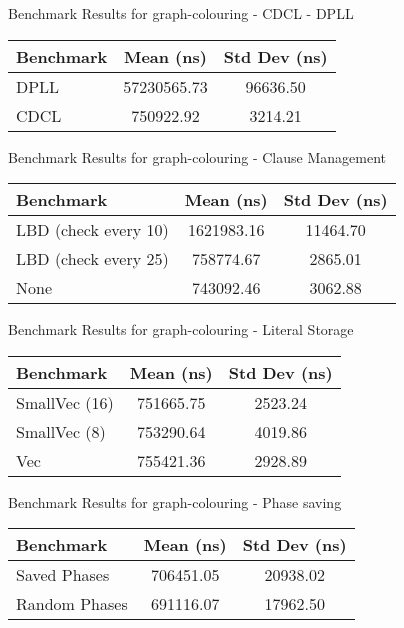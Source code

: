 \begin{cmptable}[h]{Benchmark Results for graph-colouring - CDCL - DPLL\label{tab:bench-graph-colouring---CDCL---DPLL}}
    \begin{tabular}{|l|c|c|}
        \hline
        Benchmark & Mean (ns) & Std Dev (ns) \\
        \hline
        DPLL & 57230565.73 & 96636.50 \\
        CDCL & 750922.92 & 3214.21 \\
        \hline
    \end{tabular}
\end{cmptable}


\begin{cmptable}[h]{Benchmark Results for graph-colouring - Clause Management\label{tab:bench-graph-colouring---Clause-Management}}
    \begin{tabular}{|l|c|c|}
        \hline
        Benchmark & Mean (ns) & Std Dev (ns) \\
        \hline
        LBD (check every 10) & 1621983.16 & 11464.70 \\
        LBD (check every 25) & 758774.67 & 2865.01 \\
        None & 743092.46 & 3062.88 \\
        \hline
    \end{tabular}
\end{cmptable}


\begin{cmptable}[h]{Benchmark Results for graph-colouring - Literal Storage\label{tab:bench-graph-colouring---Literal-Storage}}
    \begin{tabular}{|l|c|c|}
        \hline
        Benchmark & Mean (ns) & Std Dev (ns) \\
        \hline
        SmallVec (16) & 751665.75 & 2523.24 \\
        SmallVec (8) & 753290.64 & 4019.86 \\
        Vec & 755421.36 & 2928.89 \\
        \hline
    \end{tabular}
\end{cmptable}


\begin{cmptable}[h]{Benchmark Results for graph-colouring - Phase saving\label{tab:bench-graph-colouring---Phase-saving}}
    \begin{tabular}{|l|c|c|}
        \hline
        Benchmark & Mean (ns) & Std Dev (ns) \\
        \hline
        Saved Phases & 706451.05 & 20938.02 \\
        Random Phases & 691116.07 & 17962.50 \\
        \hline
    \end{tabular}
\end{cmptable}


